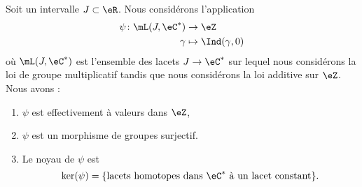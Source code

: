 \begin{proposition}       \label{PROPooGAOIooFTOuli}
	Soit un intervalle \( J\subset \eR\). Nous considérons l'application
	\begin{equation}
		\begin{aligned}
			\psi\colon \mL(J, \eC^*) & \to \eZ                \\
			\gamma                   & \mapsto \Ind(\gamma,0)
		\end{aligned}
	\end{equation}
	où \( \mL(J, \eC^*)\) est l'ensemble des lacets \( J\to \eC^*\) sur lequel nous considérons la loi de groupe multiplicatif tandis que nous considérons la loi additive sur \( \eZ\). Nous avons :
	\begin{enumerate}
		\item       \label{ITEMooKCRIooSEyhlp}
		      \( \psi\) est effectivement à valeurs dans \( \eZ\),
		\item
		      \( \psi\) est un morphisme de groupes surjectif.
		\item       \label{ITEMooZFXTooDCXTVU}
		      Le noyau de \( \psi\) est
		      \begin{equation}
			      \ker(\psi)=\{ \text{lacets homotopes dans \( \eC^*\) à un lacet constant} \}.
		      \end{equation}
	\end{enumerate}
\end{proposition}

